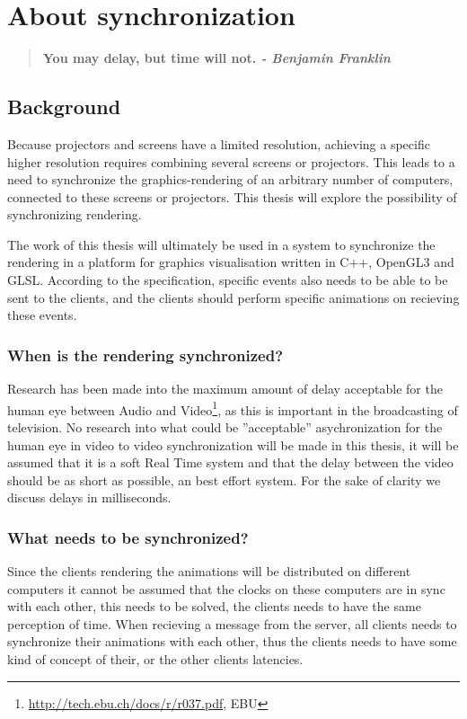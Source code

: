 \chapter{About synchronization}

\begin{quotation}
\bf You may delay, but time will not.
\rm \center \em - Benjamin Franklin
\end{quotation}

\section{Background}

Because projectors and screens have a limited resolution, achieving a specific higher resolution requires combining several screens or projectors. This leads to a need to synchronize the graphics-rendering of an arbitrary number of computers, connected to these screens or projectors. This thesis will explore the possibility of synchronizing rendering.

The work of this thesis will ultimately be used in a system to synchronize the rendering in a platform for graphics visualisation written in C++, OpenGL3 and GLSL. According to the specification, specific events also needs to be able to be sent to the clients, and the clients should perform specific animations on recieving these events.  

\subsection{When is the rendering synchronized?}

Research has been made into the maximum amount of delay acceptable for the human eye between Audio and Video\footnote{\url{http://tech.ebu.ch/docs/r/r037.pdf}, EBU}, as this is important in the broadcasting of television. No research into what could be ''acceptable'' asychronization for the human eye in video to video synchronization will be made in this thesis, it will be assumed that it is a soft Real Time system and that the delay between the video should be as short as possible, an best effort system. For the sake of clarity we discuss delays in milliseconds.

\subsection{What needs to be synchronized?}

Since the clients rendering the animations will be distributed on different computers it cannot be assumed that the clocks on these computers are in sync with each other, this needs to be solved, the clients needs to have the same perception of time. When recieving a message from the server, all clients needs to synchronize their animations with each other, thus the clients needs to have some kind of concept of their, or the other clients latencies. 

